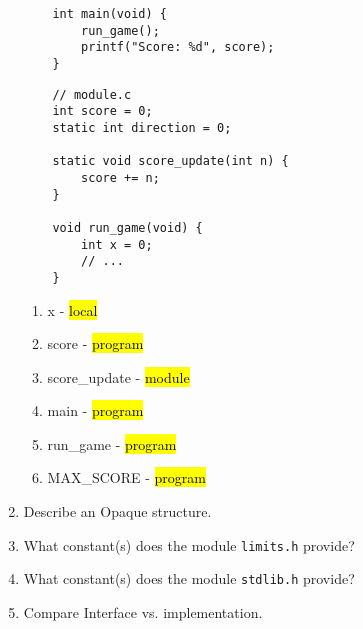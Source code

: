 \documentclass{article}
\begin{document}
\begin{enumerate}
\begin{minipage}{.5\textwidth}
\begin{lstlisting}
    int main(void) {
        run_game();
        printf("Score: %d", score);
    }
    \end{lstlisting}
    \end{minipage}%
    \begin{minipage}{.5\textwidth}
    \begin{lstlisting}
    // module.c
    int score = 0;
    static int direction = 0;
    
    static void score_update(int n) {
        score += n;
    }
    
    void run_game(void) {
        int x = 0;
        // ...
    }
    \end{lstlisting}
    \end{minipage}

    \begin{enumerate}
        \item x - \hl{local}
        \item score - \hl{program}
        \item score\_update - \hl{module}
        \item main - \hl{program}
        \item run\_game - \hl{program}
        \item MAX\_SCORE - \hl{program}
    \end{enumerate}


    \item Describe an Opaque structure.
    \vspace{16mm}
    \item What constant(s) does the module \texttt{limits.h} provide?
    \vspace{16mm}
    \item What constant(s) does the module \texttt{stdlib.h} provide?
    \vspace{16mm}
    \item Compare Interface vs. implementation.
    \vspace{16mm}


\end{enumerate}
\end{document}

